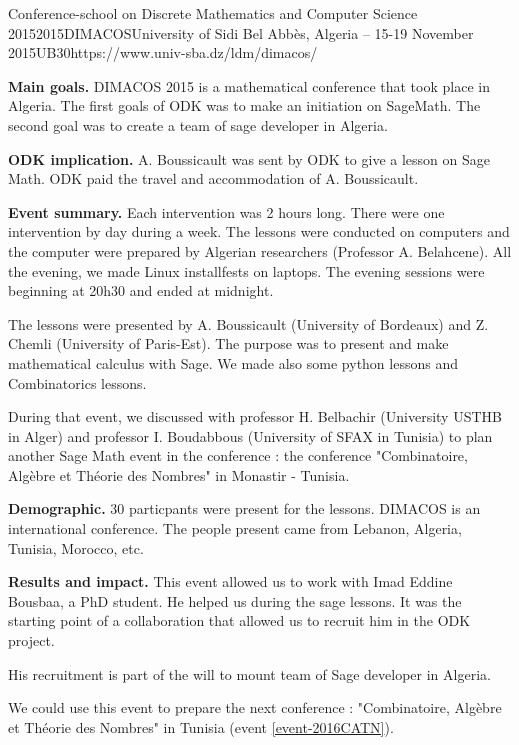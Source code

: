\begin{event}{Conference-school on Discrete Mathematics and Computer Science 2015}{2015DIMACOS}{University of Sidi Bel Abbès, Algeria -- 15-19 November 2015}{UB}{30}{https://www.univ-sba.dz/ldm/dimacos/}

\textbf{Main goals.} DIMACOS 2015 is a mathematical conference that took place in 
Algeria. The first goals of ODK was to make an initiation on SageMath. 
The second goal was to create a team of sage developer in Algeria.

\textbf{ODK implication.} A. Boussicault was sent by ODK to give a lesson on
Sage Math. ODK paid the travel and accommodation of A. Boussicault.

\textbf{Event summary.}
Each intervention was 2 hours long. There were one intervention by day during 
a week.
The lessons were conducted on computers and the computer were prepared by 
Algerian researchers (Professor A. Belahcene).
All the evening, we made Linux installfests on laptops. 
The evening sessions were beginning at 20h30 and ended at midnight.

The lessons were presented by A. Boussicault (University of Bordeaux) and 
Z. Chemli (University of Paris-Est). The purpose was to present and make 
mathematical calculus with Sage. We made also some python lessons and 
Combinatorics lessons.

During that event, we discussed with professor H. Belbachir 
(University USTHB in Alger) and professor I. Boudabbous 
(University of SFAX in Tunisia) to plan another Sage Math event in the 
conference : the conference "Combinatoire, Algèbre et Théorie des Nombres" 
in Monastir - Tunisia. 


\textbf{Demographic.} 30 particpants were present for the lessons. 
DIMACOS is an international conference. 
The people present came from Lebanon, Algeria, Tunisia, Morocco, etc.

\textbf{Results and impact.} 
This event allowed us to work with Imad Eddine Bousbaa, a PhD student. 
He helped us during the sage lessons.
It was the starting point of a collaboration that allowed us to recruit him in
the ODK project.

His recruitment is part of the will to mount team of Sage developer in Algeria.

We could use this event to prepare the next conference : "Combinatoire, Algèbre et Théorie des Nombres"
in Tunisia (event \ref{event-2016CATN}).


\end{event}
